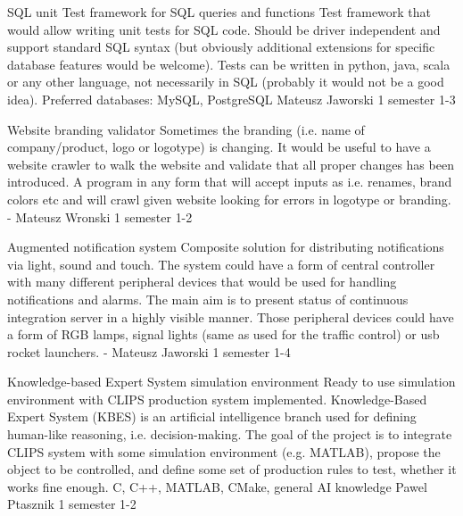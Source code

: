 \begin{project}
{SQL unit}
{Test framework for SQL queries and functions} 
{ 
Test framework that would allow writing unit tests for SQL code. Should be
driver independent and support standard SQL syntax (but obviously additional
extensions for specific database features would be welcome). Tests can be
written in python, java, scala or any other language, not necessarily in SQL
(probably it would not be a good idea).
}
{Preferred databases: MySQL, PostgreSQL}
{Mateusz Jaworski}
{1 semester}
{1-3}
\end{project}
\begin{project}
{Website branding validator}
{Sometimes the branding (i.e. name of company/product, logo or logotype) is changing. It would be useful to have a website crawler to walk the website and validate that all proper changes has been introduced.} 
{
A program in any form that will accept inputs as i.e. renames, brand colors etc and will crawl given website looking for errors in logotype or branding.
}
{-}
{Mateusz Wronski}
{1 semester}
{1-2}
\end{project}
\begin{project}
{Augmented notification system}
{Composite solution for distributing notifications via light, sound and touch.}
{
The system could have a form of central controller with many different 
peripheral devices that would be used for handling notifications and alarms. 
The main aim is to present status of continuous integration server in a highly visible manner. 
Those peripheral devices could have a form of RGB lamps, signal lights (same as used for the traffic control) or usb rocket launchers.
}
{-}
{Mateusz Jaworski}
{1 semester}
{1-4}
\end{project}
\begin{project}
{Knowledge-based Expert System simulation environment}
{Ready to use simulation environment with CLIPS production system implemented.}
{
Knowledge-Based Expert System (KBES) is an artificial intelligence branch used for defining human-like reasoning, i.e. decision-making. The goal of the project is to integrate CLIPS system with some simulation environment (e.g. MATLAB), propose the object to be controlled, and define some set of production rules to test, whether it works fine enough. }
{C, C++, MATLAB, CMake, general AI knowledge}
{Pawel Ptasznik}
{1 semester}
{1-2}
\end{project}

